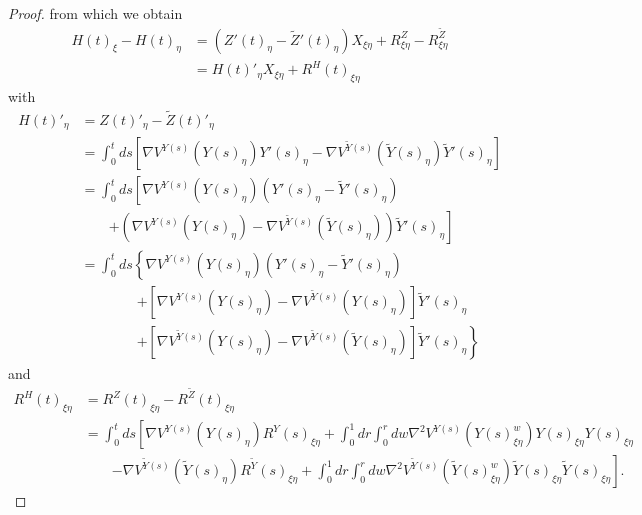 \documentclass[a4paper,12pt,reqno]{amsart}
\newcommand{\wt}{\widetilde}
\begin{document}
\begin{proof}
from which we obtain
\begin{equation*}
  \begin{split}
    H(t)_\xi  - H(t)_\eta & = (Z'(t)_\eta-\wt Z'(t)_\eta)X_{\xi\eta} +
    R^Z_{\xi\eta}-R^{\wt Z}_{\xi \eta}
\\ & = H(t)'_\eta X_{\xi\eta} + R^{H}(t)_{\xi \eta}
  \end{split}
\end{equation*}
with
\begin{equation*}
  \begin{split}
 H(t)'_\eta & = Z(t)'_\eta-\wt Z(t)'_\eta \\
& =
\int_0^t ds \left[\nabla V^{Y(s)}(Y(s)_\eta) Y'(s)_\eta-\nabla V^{\wt
    Y(s)}(\wt Y(s)_\eta) \wt Y'(s)_\eta \right]
\\ & =
\int_0^t ds \left[\nabla V^{Y(s)}(Y(s)_\eta) (Y'(s)_\eta-\wt
  Y'(s)_\eta)
\right. \\ &\qquad  \left.
+(\nabla V^{
    Y(s)}( Y(s)_\eta)-\nabla V^{\wt
    Y(s)}(\wt Y(s)_\eta)) \wt Y'(s)_\eta \right]
\\ & =
\int_0^t ds \left\{\nabla V^{Y(s)}(Y(s)_\eta) (Y'(s)_\eta-\wt
  Y'(s)_\eta)
\right. \\ & \qquad\qquad \left. + [\nabla V^{
    Y(s)}( Y(s)_\eta)-\nabla V^{\wt
    Y(s)}( Y(s)_\eta)] \wt Y'(s)_\eta
\right. \\ & \qquad\qquad \left. + [\nabla V^{
    \wt Y(s)}( Y(s)_\eta)-\nabla V^{\wt
    Y(s)}(\wt Y(s)_\eta)] \wt Y'(s)_\eta \right\}
  \end{split}
\end{equation*}
and
\begin{equation*}
  \begin{split}
   R^H(t)_{\xi\eta} & = R^Z(t)_{\xi\eta}-R^{\wt Z}(t)_{\xi \eta}
\\& =  \int_0^t ds \left[
\nabla
V^{Y(s)}(Y(s)_{\eta}) R^Y(s)_{\xi\eta}     +
\int_0^1 dr \int_0^r dw \nabla^2  V^{Y(s)}(Y(s)_{\xi\eta}^w)
Y(s)_{\xi\eta} Y(s)_{\xi\eta}
\right. \\ & \qquad \left. - \nabla
V^{\wt Y(s)}(\wt Y(s)_{\eta}) R^{\wt Y}(s)_{\xi\eta}     +
\int_0^1 dr \int_0^r dw \nabla^2  V^{\wt Y(s)}(\wt Y(s)_{\xi\eta}^w)
\wt Y(s)_{\xi\eta} \wt Y(s)_{\xi\eta}
\right].
  \end{split}
\end{equation*}


\end{proof}
\end{document}

